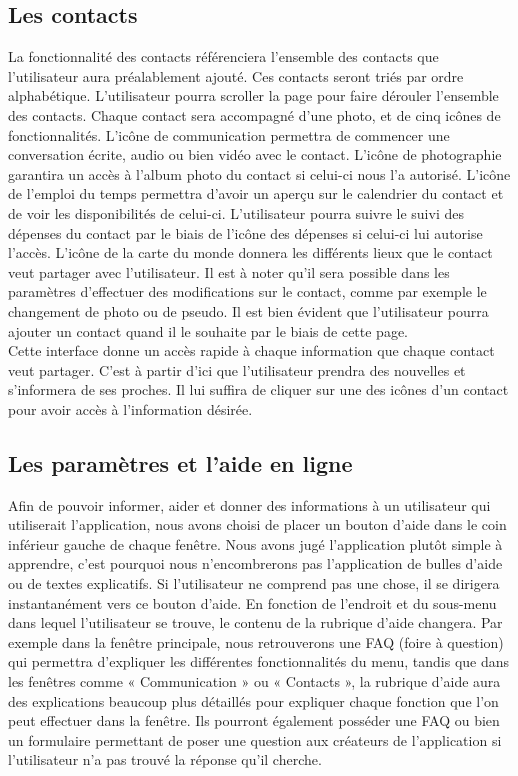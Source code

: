\documentclass[11pt]{article}
\begin{document}
\subsection{Les contacts}\label{par:contact}
La fonctionnalité des contacts référenciera l’ensemble des contacts que l’utilisateur aura préalablement ajouté. Ces contacts seront triés par ordre alphabétique. L’utilisateur pourra scroller la page pour faire dérouler l’ensemble des contacts. Chaque contact sera accompagné d’une photo, et de cinq icônes de fonctionnalités. L'icône de communication permettra de commencer une conversation écrite, audio ou bien vidéo avec le contact. L’icône de photographie garantira un accès à l’album photo du contact si celui-ci nous l’a autorisé. L’icône de l’emploi du temps permettra d’avoir un aperçu sur le calendrier du contact et de voir les disponibilités de celui-ci. L’utilisateur pourra suivre le suivi des dépenses du contact par le biais de l’icône des dépenses si celui-ci lui autorise l’accès. L’icône de la carte du monde donnera les différents lieux que le contact veut partager avec l’utilisateur. Il est à noter qu’il sera possible dans les paramètres d’effectuer des modifications sur le contact, comme par exemple le changement de photo ou de pseudo. Il est bien évident que l'utilisateur pourra ajouter un contact quand il le souhaite par le biais de cette page.~\\

Cette interface donne un accès rapide à chaque information que chaque contact veut partager. C’est à partir d’ici que l’utilisateur prendra des nouvelles et s’informera de ses proches. Il lui suffira de cliquer sur une des icônes d’un contact pour avoir accès à l’information désirée.

\subsection{Les paramètres et l'aide en ligne}\label{par:aide}
Afin de pouvoir informer, aider et donner des informations à un utilisateur qui utiliserait l’application, nous avons choisi de placer un bouton d’aide dans le coin inférieur gauche de chaque fenêtre. Nous avons jugé l’application plutôt simple à apprendre, c’est pourquoi nous n’encombrerons pas l’application de bulles d’aide ou de textes explicatifs. Si l’utilisateur ne comprend pas une chose, il se dirigera instantanément vers ce bouton d’aide. En fonction de l’endroit et du sous-menu dans lequel l’utilisateur se trouve, le contenu de la rubrique d’aide changera. Par exemple dans la fenêtre principale, nous retrouverons une FAQ (foire à question) qui permettra d’expliquer les différentes fonctionnalités du menu, tandis que dans les fenêtres comme « Communication » ou « Contacts », la rubrique d’aide aura des explications beaucoup plus détaillés pour expliquer chaque fonction que l’on peut effectuer dans la fenêtre. Ils pourront également posséder une FAQ ou bien un formulaire permettant de poser une question aux créateurs de l’application si l’utilisateur n’a pas trouvé la réponse qu’il cherche.~\\
\end{document}
